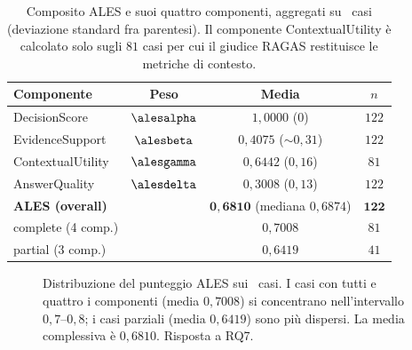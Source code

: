\begin{table}[t]
  \centering
  \caption{Composito ALES e suoi quattro componenti, aggregati su \goldn\ casi (deviazione standard fra parentesi). Il componente ContextualUtility è calcolato solo sugli $81$ casi per cui il giudice RAGAS restituisce le metriche di contesto.}
  \label{tab:ales}
  \small
  \begin{tabular}{lccc}
    \toprule
    Componente & Peso & Media & $n$ \\
    \midrule
    DecisionScore     & $\alesalpha$ & $1{,}0000$ ($0$) & $122$ \\
    EvidenceSupport   & $\alesbeta$  & $0{,}4075$ ($\sim 0{,}31$) & $122$ \\
    ContextualUtility & $\alesgamma$ & $0{,}6442$ ($0{,}16$) & $81$ \\
    AnswerQuality     & $\alesdelta$ & $0{,}3008$ ($0{,}13$) & $122$ \\
    \midrule
    \textbf{ALES (overall)} &           & $\mathbf{0{,}6810}$ (mediana $0{,}6874$) & $\mathbf{122}$ \\
    \quad complete (4 comp.) &          & $0{,}7008$ & $81$ \\
    \quad partial (3 comp.)  &          & $0{,}6419$ & $41$ \\
    \bottomrule
  \end{tabular}
\end{table}

\begin{figure}[t]
  \centering
  \caption{Distribuzione del punteggio ALES sui \goldn\ casi. I casi con tutti e quattro i componenti (media $0{,}7008$) si concentrano nell'intervallo $0{,}7$--$0{,}8$; i casi parziali (media $0{,}6419$) sono più dispersi. La media complessiva è $0{,}6810$. Risposta a RQ7.}
  \label{fig:ales-dist}
\end{figure}

